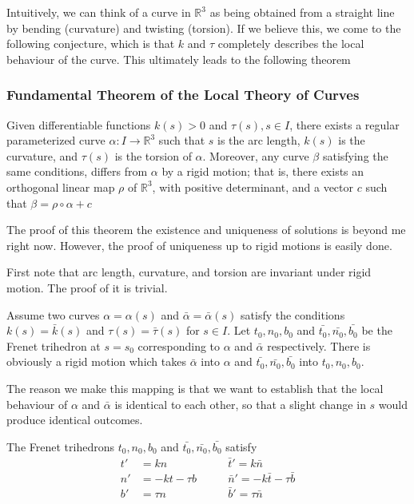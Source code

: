 \documentclass{article}
\newcommand{\R}{\mathbb{R}}
\begin{document}
	Intuitively, we can think of a curve in $\R^3$ as being obtained from a straight line by bending (curvature) and twisting (torsion). If we believe this, we come to the following conjecture, which is that $k$ and $\tau$ completely describes the local behaviour of the curve. This ultimately leads to the following theorem
	
	\subsubsection*{Fundamental Theorem of the Local Theory of Curves}
	Given differentiable functions $k(s) > 0$ and $\tau(s), s \in I$, there exists a regular parameterized curve $\alpha \colon I \to \R^3$ such that $s$ is the arc length, $k(s)$ is the curvature, and $\tau(s)$ is the torsion of $\alpha$. Moreover, any curve $\beta$ satisfying the same conditions, differs from $\alpha$ by a rigid motion; that is, there exists an orthogonal linear map $\rho$ of $\R^3$, with positive determinant, and a vector $c$ such that $\beta = \rho \circ \alpha + c$
	
	The proof of this theorem the existence and uniqueness of solutions is beyond me right now. However, the proof of uniqueness up to rigid motions is easily done.
	
	First note that arc length, curvature, and torsion are invariant under rigid motion. The proof of it is trivial.
	
	Assume two curves $\alpha = \alpha(s)$ and $\bar{\alpha} = \bar{\alpha}(s)$ satisfy the conditions $k(s) = \bar{k}(s)$ and $\tau(s) = \bar{\tau}(s)$ for $s \in I$. Let $t_0, n_0, b_0$ and $\bar{t_0}, \bar{n_0}, \bar{b_0}$ be the Frenet trihedron at $s = s_0$ corresponding to $\alpha$ and $\bar{\alpha}$ respectively. There is obviously a rigid motion which takes $\bar{\alpha}$ into $\alpha$ and $\bar{t_0}, \bar{n_0}, \bar{b_0}$ into $t_0, n_0, b_0$.
	
	The reason we make this mapping is that we want to establish that the local behaviour of $\alpha$ and $\bar{\alpha}$ is identical to each other, so that a slight change in $s$ would produce identical outcomes.
	
	The Frenet trihedrons $t_0, n_0, b_0$ and $\bar{t_0}, \bar{n_0}, \bar{b_0}$ satisfy
	\begin{align*}
		t' &= kn \qquad &\bar{t}' = k\bar{n} \\
		n' &= -kt - \tau b \qquad &\bar{n}' = -k\bar{t} - \tau \bar{b} \\
		b' &= \tau n \qquad &\bar{b}' = \tau \bar{n}
	\end{align*}
	
\end{document}

